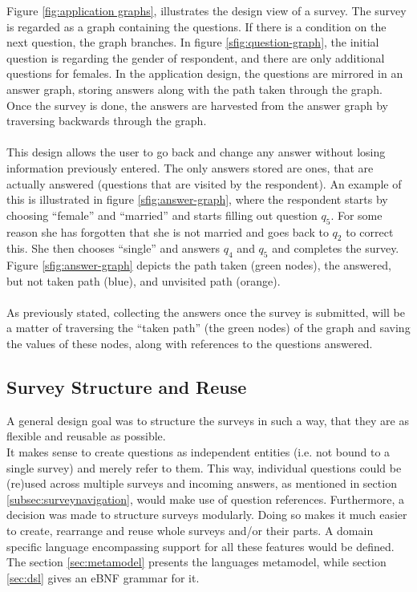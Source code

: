 Figure \ref{fig:application graphs}, illustrates the design view of a survey. The survey is regarded as a graph containing the questions. If there is a condition on the next question, the graph branches. In figure \ref{sfig:question-graph}, the initial question is regarding the gender of respondent, and there are only additional questions for females. In the application design, the questions are mirrored in an answer graph, storing answers along with the path taken through the graph. Once the survey is done, the answers are harvested from the answer graph by traversing backwards through the graph. \\\\
This design allows the user to go back and change any answer without losing information previously entered. The only answers stored are ones, that are actually answered (questions that are visited by the respondent). An example of this is illustrated in figure \ref{sfig:answer-graph}, where the respondent starts by choosing ``female'' and ``married'' and starts filling out question $q_5$. For some reason she has forgotten that she is not married and goes back to $q_2$ to correct this. She then chooses ``single'' and answers $q_4$ and $q_5$ and completes the survey. Figure \ref{sfig:answer-graph} depicts the path taken (green nodes), the answered, but not taken path (blue), and unvisited path (orange).\\\\
As previously stated, collecting the answers once the survey is submitted, will be a matter of traversing the ``taken path'' (the green nodes) of the graph and saving the values of these nodes, along with references to the questions answered.

\subsection{Survey Structure and Reuse}
\label{subsec:modularityandreuse}
A general design goal was to structure the surveys in such a way, that they are as flexible and reusable as possible. \\
It makes sense to create questions as independent entities (i.e. not bound to a single survey) and merely refer to them. This way, individual questions could be (re)used across multiple surveys and incoming answers, as mentioned in section \ref{subsec:surveynavigation}, would make use of question references. Furthermore, a decision was made to structure surveys modularly. Doing so makes it much easier to create, rearrange and reuse whole surveys and/or their parts. 
A domain specific language encompassing support for all these features would be defined. The section \ref{sec:metamodel} presents the languages metamodel, while section \ref{sec:dsl} gives an eBNF grammar for it.

